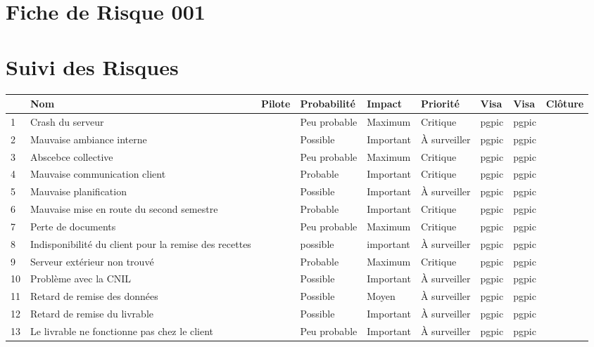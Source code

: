 \documentclass[asi]{picINSA}
\title{\PRO{}}
\author{\Pierre}
\begin{document}
\couverture{}

\informationsGenerales{}

 
\chapter*{Fiche de Risque 001}


\chapter*{Suivi des Risques}
\begin{longtable}{|p{0.3cm}|p{2.5cm}|p{1.5cm}|p{2cm}|p{1.8cm}|p{1.5cm}|p{1cm}|p{1cm}|p{1.5cm}|}
			\hline
			\rowcolor{gray!40}
			\No & Nom & Pilote & Probabilité & Impact & Priorité & Visa \RQCourt{} & Visa \CPCourt{} & Clôture \\\hline
			 1 & Crash du serveur &  & Peu probable & Maximum & Critique & pgpic & pgpic & \\\hline
			 2 & Mauvaise ambiance interne &  & Possible & Important & À surveiller & pgpic & pgpic & \\\hline
			 3 & Abscebce collective &  & Peu probable & Maximum & Critique & pgpic & pgpic & \\\hline
			 4 & Mauvaise communication client &  & Probable & Important & Critique & pgpic & pgpic & \\\hline
			 5 & Mauvaise planification &  & Possible & Important & À surveiller & pgpic & pgpic & \\\hline
			 6 & Mauvaise mise en route du second semestre &  & Probable & Important & Critique & pgpic & pgpic & \\\hline
			 7 & Perte de documents &  & Peu probable & Maximum & Critique & pgpic & pgpic & \\\hline
			 8 & Indisponibilité du client pour la remise des recettes &  & possible & important & À surveiller & pgpic & pgpic & \\\hline
			 9 & Serveur extérieur non trouvé &  & Probable & Maximum & Critique & pgpic & pgpic & \\\hline
			 10 & Problème avec la CNIL &  & Possible & Important & À surveiller & pgpic & pgpic & \\\hline
			 11 & Retard de remise des données & & Possible & Moyen & À surveiller & pgpic & pgpic & \\\hline
			 12 & Retard de remise du livrable & & Possible & Important & À surveiller & pgpic & pgpic & \\\hline
			 13 & Le livrable ne fonctionne pas chez le client & & Peu probable & Important & À surveiller & pgpic & pgpic & \\\hline
\end{longtable}
\end{document}
